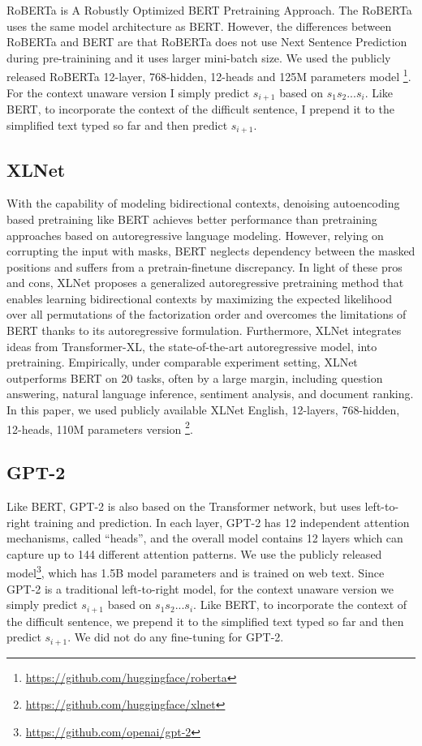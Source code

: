 \documentclass[11pt]{article}
\begin{document}
RoBERTa is A Robustly Optimized BERT Pretraining Approach. The RoBERTa uses the same model architecture as BERT. However, the differences between RoBERTa and BERT are that RoBERTa does not use Next Sentence Prediction during pre-trainining and it uses larger mini-batch size. We used the publicly released RoBERTa 12-layer, 768-hidden, 12-heads and 125M parameters model \footnote{\url{https://github.com/huggingface/roberta}}. For the context unaware version I simply predict $s_{i+1}$ based on $s_1 s_2 ... s_i$.  Like BERT, to incorporate the context of the difficult sentence, I prepend it to the simplified text typed so far and then predict $s_{i+1}$.

\subsection{XLNet}

With the capability of modeling bidirectional contexts, denoising autoencoding based pretraining like BERT achieves better performance than pretraining approaches based on autoregressive language modeling. However, relying on corrupting the input with masks, BERT neglects dependency between the masked positions and suffers from a pretrain-finetune discrepancy. In light of these pros and cons, XLNet proposes a generalized autoregressive pretraining method that enables learning bidirectional contexts by maximizing the expected likelihood over all permutations of the factorization order and overcomes the limitations of BERT thanks to its autoregressive formulation. Furthermore, XLNet integrates ideas from Transformer-XL, the state-of-the-art autoregressive model, into pretraining. Empirically, under comparable experiment setting, XLNet outperforms BERT on 20 tasks, often by a large margin, including question answering, natural language inference, sentiment analysis, and document ranking. In this paper, we used publicly available XLNet English, 12-layers, 768-hidden, 12-heads, 110M parameters version \footnote{\url{https://github.com/huggingface/xlnet}}.

\subsection{GPT-2} 

Like BERT, GPT-2 is also based on the Transformer network, but uses left-to-right training and prediction. In each layer, GPT-2 has 12 independent attention mechanisms, called ``heads'', and the overall model contains 12 layers which can capture up to 144 different attention patterns.  We use the publicly released model\footnote{\url{https://github.com/openai/gpt-2}}, which has 1.5B model parameters and is trained on web text.  Since GPT-2 is a traditional left-to-right model, for the context unaware version we simply predict $s_{i+1}$ based on $s_1 s_2 ... s_i$.  Like BERT, to incorporate the context of the difficult sentence, we prepend it to the simplified text typed so far and then predict $s_{i+1}$.  We did not do any fine-tuning for GPT-2.
\end{document}
